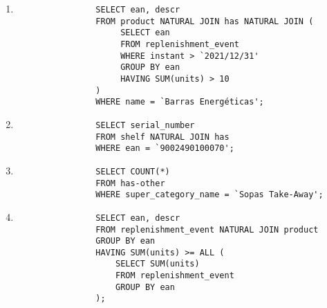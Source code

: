 \documentclass{article}
\begin{document}
	\begin{enumerate}[label=\arabic*)]
		\item
			\begin{verbatim}
				SELECT ean, descr
				FROM product NATURAL JOIN has NATURAL JOIN (
				     SELECT ean
				     FROM replenishment_event
				     WHERE instant > `2021/12/31'
				     GROUP BY ean
				     HAVING SUM(units) > 10
				)
				WHERE name = `Barras Energéticas';
			\end{verbatim}

		\vspace{5mm}

		\item
			\begin{verbatim}
				SELECT serial_number
				FROM shelf NATURAL JOIN has
				WHERE ean = `9002490100070';
			\end{verbatim}

		\vspace{5mm}

		\item
			\begin{verbatim}
				SELECT COUNT(*)
				FROM has-other
				WHERE super_category_name = `Sopas Take-Away';
			\end{verbatim}

		\vspace{5mm}

		\item
			\begin{verbatim}
				SELECT ean, descr
				FROM replenishment_event NATURAL JOIN product
				GROUP BY ean
				HAVING SUM(units) >= ALL (
				    SELECT SUM(units)
				    FROM replenishment_event
				    GROUP BY ean
				);
			\end{verbatim}
	\end{enumerate}
\end{document}
